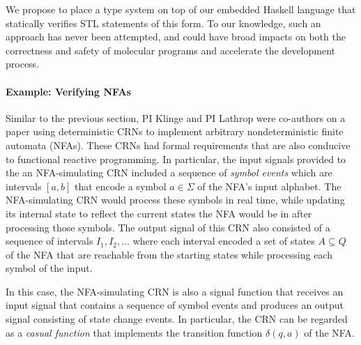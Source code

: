 We propose to place a type system on top of our embedded Haskell language that statically verifies STL statements of this form.
To our knowledge, such an approach has never been attempted, and could have broad impacts on both the correctness and safety of molecular programs and accelerate the development process.

\paragraph{Example: Verifying NFAs}
Similar to the previous section, PI Klinge and PI Lathrop were co-authors on a paper using deterministic CRNs to implement arbitrary nondeterministic finite automata (NFAs).
These CRNs had formal requirements that are also conducive to functional reactive programming.
In particular, the input signals provided to the an NFA-simulating CRN included a sequence of \emph{symbol events} which are intervals \( [a,b] \) that encode a symbol \( a\in\Sigma \) of the NFA's input alphabet.
The NFA-simulating CRN would process these symbols in real time, while updating its internal state to reflect the current states the NFA would be in after processing those symbols.
The output signal of this CRN also consisted of a sequence of intervals \( I_1, I_2, \ldots \) where each interval encoded a set of states \( A\subseteq Q \) of the NFA that are reachable from the starting states while processing each symbol of the input.

In this case, the NFA-simulating CRN is also a signal function that receives an input signal that contains a sequence of symbol events and produces an output signal consisting of state change events.
In particular, the CRN can be regarded as a \emph{casual function} that implements the transition function \( \delta(q,a) \) of the NFA.




